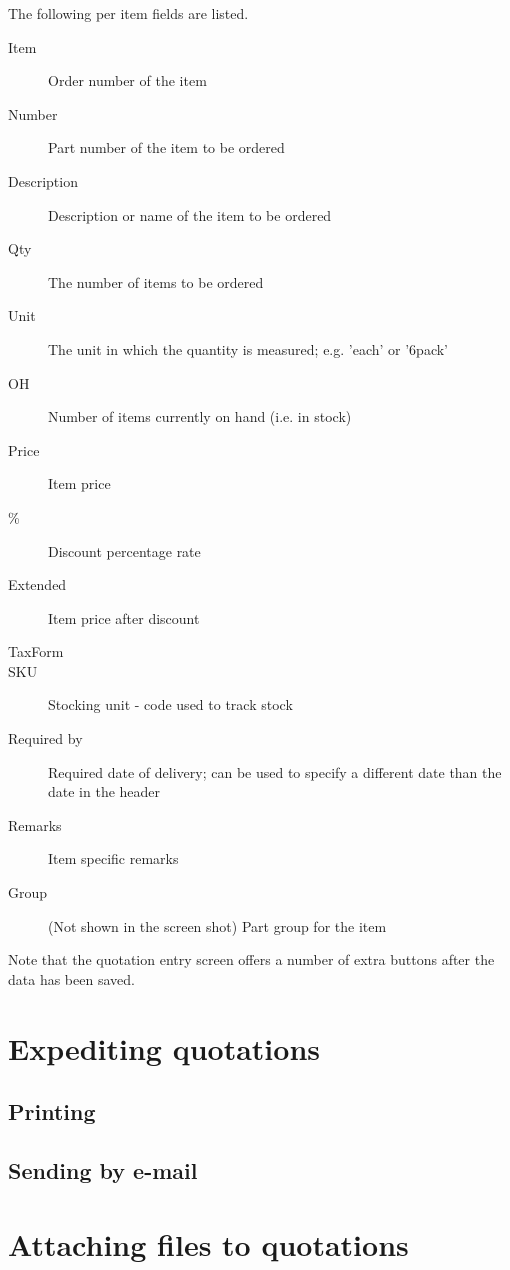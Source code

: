 The following per item fields are listed.

\begin{description}
\item [Item] Order number of the item
\item [Number] Part number of the item to be ordered
\item [Description] Description or name of the item to be ordered
\item [Qty] The number of items to be ordered
\item [Unit] The unit in which the quantity is measured; e.g. 'each' or '6pack'
\item [OH] Number of items currently on hand (i.e. in stock)
\item [Price] Item price
\item [\%] Discount percentage rate
\item [Extended] Item price after discount
\item [TaxForm] %
\item [SKU] Stocking unit - code used to track stock
\item [Required by] Required date of delivery; can be used to specify a different date
   than the date in the header
\item [Remarks] Item specific remarks
\item [Group] (Not shown in the screen shot) Part group for the item
\end{description}

Note that the quotation entry screen offers a number of extra buttons after the data has
been saved.

\section{Expediting quotations}

\subsection{Printing}

\subsection{Sending by e-mail}
\label{subsec:sending-quotation-by-email}

\section{Attaching files to quotations}
\label{sec:FileAttachments}



